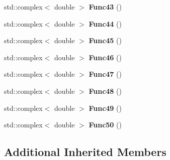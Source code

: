 \begin{DoxyCompactItemize}
\item 
\hypertarget{classosea_1_1ofreq_1_1_eqn_translation_a916d10d7c56ae92d98de3986f2a131ef}{std\-::complex$<$ double $>$ {\bfseries Func43} ()}\label{classosea_1_1ofreq_1_1_eqn_translation_a916d10d7c56ae92d98de3986f2a131ef}

\item 
\hypertarget{classosea_1_1ofreq_1_1_eqn_translation_a0ce24a5b1db03adcffd51e97ace09326}{std\-::complex$<$ double $>$ {\bfseries Func44} ()}\label{classosea_1_1ofreq_1_1_eqn_translation_a0ce24a5b1db03adcffd51e97ace09326}

\item 
\hypertarget{classosea_1_1ofreq_1_1_eqn_translation_aaa3e94d3c1f99a3642a5747446b26ddc}{std\-::complex$<$ double $>$ {\bfseries Func45} ()}\label{classosea_1_1ofreq_1_1_eqn_translation_aaa3e94d3c1f99a3642a5747446b26ddc}

\item 
\hypertarget{classosea_1_1ofreq_1_1_eqn_translation_a84705a29bca50a273c8e18d8775e5a48}{std\-::complex$<$ double $>$ {\bfseries Func46} ()}\label{classosea_1_1ofreq_1_1_eqn_translation_a84705a29bca50a273c8e18d8775e5a48}

\item 
\hypertarget{classosea_1_1ofreq_1_1_eqn_translation_ab213b139add2e6fb33a4b7ab27d0bce0}{std\-::complex$<$ double $>$ {\bfseries Func47} ()}\label{classosea_1_1ofreq_1_1_eqn_translation_ab213b139add2e6fb33a4b7ab27d0bce0}

\item 
\hypertarget{classosea_1_1ofreq_1_1_eqn_translation_a7783f7d20c62ef93424a84595bddda74}{std\-::complex$<$ double $>$ {\bfseries Func48} ()}\label{classosea_1_1ofreq_1_1_eqn_translation_a7783f7d20c62ef93424a84595bddda74}

\item 
\hypertarget{classosea_1_1ofreq_1_1_eqn_translation_a0ed9b4791abf0024f09508c588612490}{std\-::complex$<$ double $>$ {\bfseries Func49} ()}\label{classosea_1_1ofreq_1_1_eqn_translation_a0ed9b4791abf0024f09508c588612490}

\item 
\hypertarget{classosea_1_1ofreq_1_1_eqn_translation_a138a4372b52ad6e1ef924084a4d760bd}{std\-::complex$<$ double $>$ {\bfseries Func50} ()}\label{classosea_1_1ofreq_1_1_eqn_translation_a138a4372b52ad6e1ef924084a4d760bd}

\end{DoxyCompactItemize}
\subsection*{Additional Inherited Members}


